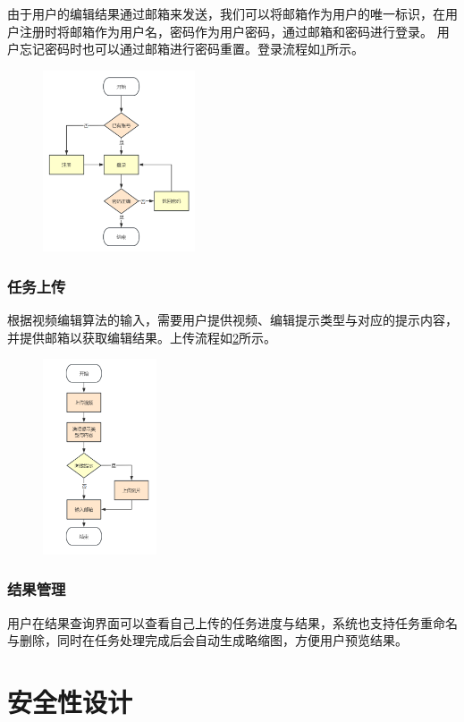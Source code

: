 由于用户的编辑结果通过邮箱来发送，我们可以将邮箱作为用户的唯一标识，在用户注册时将邮箱作为用户名，密码作为用户密码，通过邮箱和密码进行登录。
用户忘记密码时也可以通过邮箱进行密码重置。登录流程如\ref{fig:login_process}所示。
\begin{figure}[ht]
    \centering
    \includegraphics[width=0.4\textwidth]{source/img/login_process.png}
    \label{fig:login_process}
\end{figure}

\subsubsection{任务上传}

根据视频编辑算法的输入，需要用户提供视频、编辑提示类型与对应的提示内容，并提供邮箱以获取编辑结果。上传流程如\ref{fig:upload_process}所示。
\begin{figure}[ht]
    \centering
    \includegraphics[width=0.3\textwidth]{source/img/edit_process.png}
    \label{fig:upload_process}
\end{figure}

\subsubsection{结果管理}

用户在结果查询界面可以查看自己上传的任务进度与结果，系统也支持任务重命名与删除，同时在任务处理完成后会自动生成略缩图，方便用户预览结果。

\section{安全性设计}

